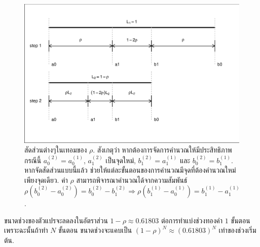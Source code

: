 %
\begin{figure}
\begin{center}
\includegraphics[width=6.0in]
{02Background/goldsecRho.eps}
\end{center}
\caption{สัดส่วนต่างๆในเทอมของ $\rho$.
สังเกตุว่า หากต้องการจัดการคำนวณให้มีประสิทธิภาพ กรณีนี้ $a_0^{(2)} = a_0^{(1)}$, $a_1^{(2)}$ เป็นจุดใหม่, $b_1^{(2)}=a_1^{(1)}$ และ $b_0^{(2)} = b_1^{(1)}$.
หากจัดสัดส่วนแบบนี้แล้ว ช่วยให้แต่ละขั้นตอนของการคำนวณมีจุดที่ต้องคำนวณใหม่เพียงจุดเดียว.
ค่า $\rho$ สามารถพิจารณาคำนวณได้จากความสัมพันธ์ $\rho (b_0^{(2)} - a_0^{(2)}) = b_0^{(2)} - b_1^{(2)} \Rightarrow \rho (b_1^{(1)} - a_0^{(1)}) = b_1^{(1)} - a_1^{(1)}$.}
\label{fig: golden search rho}
\end{figure}
%

ขนาดช่วงของตัวแปรจะลดลงในอัตราส่วน $1-\rho \approx 0.61803$ ต่อการทำแบ่งช่วงทองคำ $1$ ขั้นตอน เพราะฉะนั้นถ้าทำ $N$ ขั้นตอน ขนาดช่วงจะแคบเป็น $(1-\rho)^N \approx (0.61803)^N$ เท่าของช่วงเริ่มต้น.

